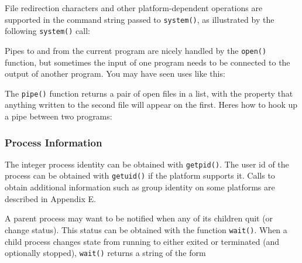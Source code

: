 
File redirection characters and other platform-dependent operations are
supported in the command string passed to \texttt{system()}, as
illustrated by the following \texttt{system()} call:


Pipes to and from the current program are nicely handled by the
\texttt{open()} function, but sometimes the input of one program needs
to be connected to the output of another program. You may have seen
uses like this:


The \texttt{pipe()} function returns a pair of open files in a list,
with the property that anything written to the second file will appear
on the first. Here{\textquotesingle}s how to hook up a pipe between two
programs:


\subsubsection{Process Information}

The integer process identity can be obtained with
\texttt{getpid()}. The user id of the process can be
obtained with \texttt{getuid()} if the platform
supports it. Calls to obtain additional information such as group
identity on some platforms are described in Appendix E.

A parent process may want to be notified when any of its children quit
(or change status). This status can be obtained with the function
\texttt{wait()}. When a child process changes state from
{\textquotedbl}running{\textquotedbl} to either
{\textquotedbl}exited{\textquotedbl} or
{\textquotedbl}terminated{\textquotedbl} (and optionally
{\textquotedbl}stopped{\textquotedbl}), \texttt{wait()} returns a
string of the form


